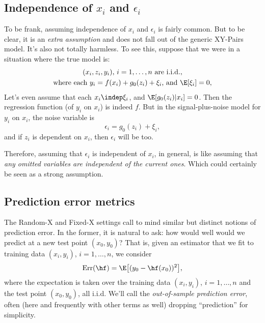 \documentclass{article}
\begin{document}
\subsection{Independence of $x_i$ and $\epsilon_i$}

To be frank, assuming independence of $x_i$ and $\epsilon_i$ is fairly common.
But to be clear, it is an \emph{extra assumption} and does not fall out of the
generic XY-Pairs model. It's also not totally harmless. To see this, suppose
that we were in a situation where the true model is:  
\begin{gather*}
\text{$(x_i, z_i, y_i)$, $i=1,\dots,n$ are i.i.d.}, \\
\text{where each $y_i = f(x_i) + g_0(z_i) + \xi_i$, and $\E[\xi_i] = 0$}, 
\end{gather*}
Let's even assume that each $x_i \indep \xi_i$, and $\E[g_0(z_i) | x_i] =
0$. Then the regression function (of $y_i$ on $x_i$) is indeed $f$. But in the  
signal-plus-noise model for $y_i$ on $x_i$, the noise variable is 
\[
\epsilon_i = g_0(z_i) + \xi_i,
\]
and if $z_i$ is dependent on $x_i$, then $\epsilon_i$ will be too.

Therefore, assuming that $\epsilon_i$ is independent of $x_i$, in general, is
like assuming that \emph{any omitted variables are independent of the current
  ones}. Which could certainly be seen as a strong assumption.   

\subsection{Prediction error metrics}

\def\Err{\mathrm{Err}}
\def\Risk{\mathrm{Risk}}

The Random-X and Fixed-X settings call to mind similar but distinct notions of 
prediction error. In the former, it is natural to ask: how would well would we
predict at a new test point $(x_0,y_0)$? That is, given an estimator
\smash{$\hf$} that we fit to training data $(x_i,y_i)$, $i=1,\dots,n$, we 
consider       
\begin{equation}
\label{eq:random_x_error}
\Err(\hf) = \E\big[ (y_0 - \hf(x_0))^2 \big],
\end{equation}
where the expectation is taken over the training data $(x_i,y_i)$, $i=1,\dots,n$
and the test point $(x_0,y_0)$, all i.i.d. We'll call \smash{$\Err(\hf)$} the
\emph{out-of-sample prediction error}, often (here and frequently with other
terms as well) dropping ``prediction'' for simplicity.  
\end{document}
